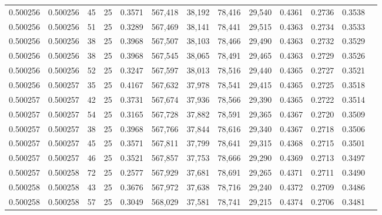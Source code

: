 \begin{tabular}{rrrrrrrrrrrrr}
0.500256 & 0.500256 &    45 &  25 &                                     0.3571 & 567,418 &  38,192 &  78,416 &  29,540 & 0.4361 & 0.2736 & 0.3538 \\
0.500256 & 0.500256 &    51 &  25 &                                     0.3289 & 567,469 &  38,141 &  78,441 &  29,515 & 0.4363 & 0.2734 & 0.3533 \\
0.500256 & 0.500256 &    38 &  25 &                                     0.3968 & 567,507 &  38,103 &  78,466 &  29,490 & 0.4363 & 0.2732 & 0.3529 \\
0.500256 & 0.500256 &    38 &  25 &                                     0.3968 & 567,545 &  38,065 &  78,491 &  29,465 & 0.4363 & 0.2729 & 0.3526 \\
0.500256 & 0.500256 &    52 &  25 &                                     0.3247 & 567,597 &  38,013 &  78,516 &  29,440 & 0.4365 & 0.2727 & 0.3521 \\
0.500256 & 0.500257 &    35 &  25 &                                     0.4167 & 567,632 &  37,978 &  78,541 &  29,415 & 0.4365 & 0.2725 & 0.3518 \\
0.500257 & 0.500257 &    42 &  25 &                                     0.3731 & 567,674 &  37,936 &  78,566 &  29,390 & 0.4365 & 0.2722 & 0.3514 \\
0.500257 & 0.500257 &    54 &  25 &                                     0.3165 & 567,728 &  37,882 &  78,591 &  29,365 & 0.4367 & 0.2720 & 0.3509 \\
0.500257 & 0.500257 &    38 &  25 &                                     0.3968 & 567,766 &  37,844 &  78,616 &  29,340 & 0.4367 & 0.2718 & 0.3506 \\
0.500257 & 0.500257 &    45 &  25 &                                     0.3571 & 567,811 &  37,799 &  78,641 &  29,315 & 0.4368 & 0.2715 & 0.3501 \\
0.500257 & 0.500257 &    46 &  25 &                                     0.3521 & 567,857 &  37,753 &  78,666 &  29,290 & 0.4369 & 0.2713 & 0.3497 \\
0.500257 & 0.500258 &    72 &  25 &                                     0.2577 & 567,929 &  37,681 &  78,691 &  29,265 & 0.4371 & 0.2711 & 0.3490 \\
0.500258 & 0.500258 &    43 &  25 &                                     0.3676 & 567,972 &  37,638 &  78,716 &  29,240 & 0.4372 & 0.2709 & 0.3486 \\
0.500258 & 0.500258 &    57 &  25 &                                     0.3049 & 568,029 &  37,581 &  78,741 &  29,215 & 0.4374 & 0.2706 & 0.3481 \\

\end{tabular}
